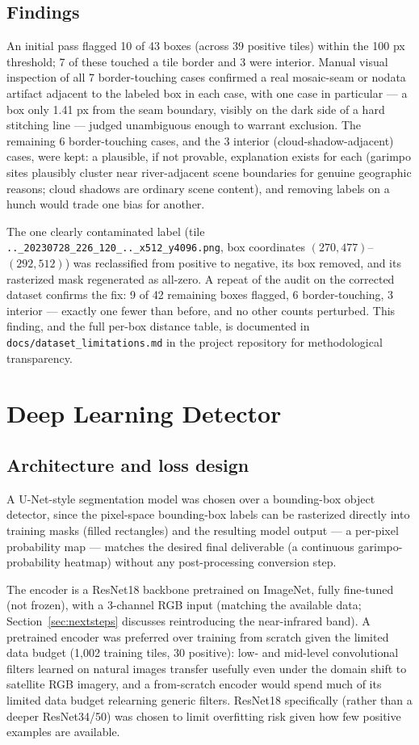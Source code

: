 \documentclass[11pt,a4paper]{article}
\begin{document}
\subsection{Findings}
An initial pass flagged 10 of 43 boxes (across 39 positive tiles) within the
100 px threshold; 7 of these touched a tile border and 3 were interior.
Manual visual inspection of all 7 border-touching cases confirmed a real
mosaic-seam or nodata artifact adjacent to the labeled box in each case, with
one case in particular --- a box only 1.41 px from the seam boundary, visibly
on the dark side of a hard stitching line --- judged unambiguous enough to
warrant exclusion. The remaining 6 border-touching cases, and the 3 interior
(cloud-shadow-adjacent) cases, were kept: a plausible, if not provable,
explanation exists for each (garimpo sites plausibly cluster near
river-adjacent scene boundaries for genuine geographic reasons; cloud shadows
are ordinary scene content), and removing labels on a hunch would trade one
bias for another.

The one clearly contaminated label (tile
\texttt{..\_20230728\_226\_120\_..\_x512\_y4096.png}, box coordinates
$(270, 477)$--$(292, 512)$) was reclassified from positive to negative, its
box removed, and its rasterized mask regenerated as all-zero. A repeat of the
audit on the corrected dataset confirms the fix: 9 of 42 remaining boxes
flagged, 6 border-touching, 3 interior --- exactly one fewer than before, and
no other counts perturbed. This finding, and the full per-box distance table,
is documented in \texttt{docs/dataset\_limitations.md} in the project
repository for methodological transparency.

\section{Deep Learning Detector}
\label{sec:model}

\subsection{Architecture and loss design}
A U-Net-style segmentation model was chosen over a bounding-box object
detector, since the pixel-space bounding-box labels can be rasterized
directly into training masks (filled rectangles) and the resulting model
output --- a per-pixel probability map --- matches the desired final
deliverable (a continuous garimpo-probability heatmap) without any
post-processing conversion step.

The encoder is a ResNet18 backbone pretrained on ImageNet, fully fine-tuned
(not frozen), with a 3-channel RGB input (matching the available data;
Section~\ref{sec:nextsteps} discusses reintroducing the near-infrared band).
A pretrained encoder was preferred over training from scratch given the
limited data budget (1,002 training tiles, 30 positive): low- and mid-level
convolutional filters learned on natural images transfer usefully even under
the domain shift to satellite RGB imagery, and a from-scratch encoder would
spend much of its limited data budget relearning generic filters. ResNet18
specifically (rather than a deeper ResNet34/50) was chosen to limit
overfitting risk given how few positive examples are available.
\end{document}
